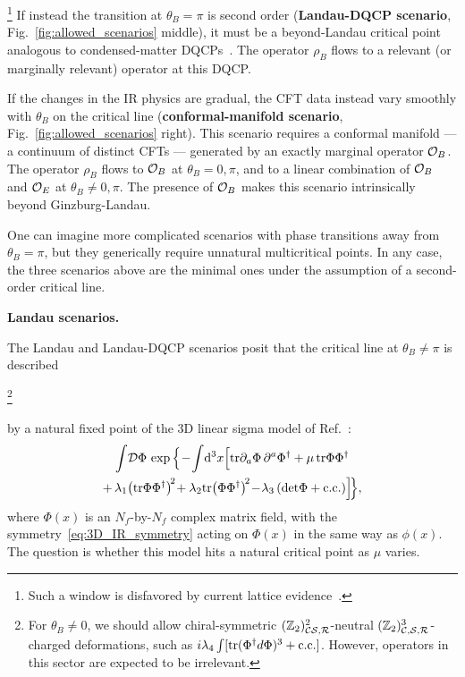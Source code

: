 \documentclass[
 reprint,







nofootinbib,


 amsmath,amssymb,
 aps,
 prd






tightenlines
]{revtex4-2}
\begin{document}
\footnote{Such a window is disfavored by current lattice evidence~\cite{Bonati:2018fvg,Cuteri:2022vwk}.}
If instead the
transition at $\theta_B = \pi$ is second order ({\bf Landau-DQCP
scenario}, Fig.~\ref{fig:allowed_scenarios} middle), it must be a
beyond-Landau critical point analogous to condensed-matter
DQCPs~\cite{Senthil:2003eed,Senthil:2004fuw,Senthil:2023vqd}. The
operator $\rho_B$ flows to a relevant (or marginally relevant) operator
at this DQCP.

If the changes in the IR physics are gradual, the CFT data instead vary smoothly with $\theta_B$ on the critical line ({\bf conformal-manifold scenario}, Fig.~\ref{fig:allowed_scenarios} right).
This scenario requires a conformal manifold --- a continuum of distinct
CFTs --- generated by an exactly marginal operator $\mathcal{O}_{B}$. The
operator $\rho_B$ flows to $\mathcal{O}_{B}$ at $\theta_B=0,\pi$, and to a
linear combination of $\mathcal{O}_{B}$ and $\mathcal{O}_{E}$ at
$\theta_B\neq0,\pi$. The presence of $\mathcal{O}_{B}$ makes this scenario
intrinsically beyond Ginzburg-Landau.

One can imagine more complicated scenarios with phase transitions
away from $\theta_B=\pi$, but they generically require unnatural
multicritical points. In any case, the three scenarios above are the
minimal ones under the assumption of a second-order critical line.



{\bf Landau scenarios.}


The Landau and Landau-DQCP scenarios posit that the critical line at
$\theta_B \neq \pi$ is described

\footnote{
For $\theta_B\neq0$, we should allow chiral-symmetric $(\mathbb{Z}_2)^2_{\mathcal{C}\mathcal{S},\mathcal{R}}$-neutral $(\mathbb{Z}_2)^3_{\mathcal{C},\mathcal{S},\mathcal{R}}$-charged deformations, such as $i\lambda_4 \int[\mathrm{tr} (\Phi^\dagger d \Phi)^3 + \text{c.c.}]$.
However, operators in this sector are expected to be irrelevant.}

by a natural fixed point of the 3D linear sigma model of
Ref.~\cite{Pisarski:1983ms}:
\begin{align}\label{eq:Landau-Ginzburg}
\begin{gathered}
    \int\!\calD\Phi\,\exp\Big\{\!-\!\int\!\d^3x\Big[\tr \partial_{a}\Phi\,\partial^{a}\Phi^{\dag} + \mu\,\tr\Phi\Phi^{\dag} \\
    +\, \lambda_1\!\left(\tr\Phi\Phi^{\dag}\right)^{\!2} \!+\lambda_2\tr\!\left(\Phi\Phi^{\dag}\right)^{\!2} \!- \!\lambda_3\left(\det\!\Phi + \text{c.c.}\right)\!\Big]\!\Big\},
\end{gathered}
\end{align}
where $\Phi(x)$ is an $N_f$-by-$N_f$ complex matrix field, with the symmetry~\eqref{eq:3D_IR_symmetry} acting on $\Phi(x)$ in the same way as $\phi(x)$.
The question is whether this model hits a natural critical point as $\mu$ varies.
\end{document}
